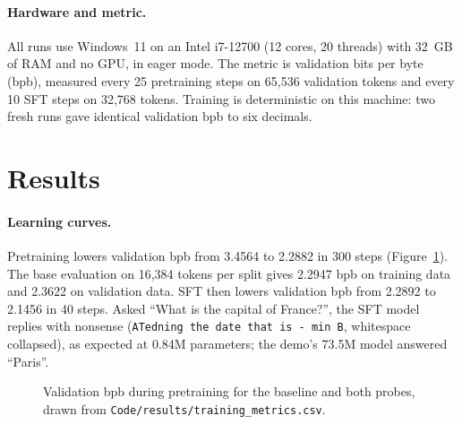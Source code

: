 \documentclass[11pt]{article}
\begin{document}
\paragraph{Hardware and metric.} All runs use Windows~11 on an Intel
i7-12700 (12 cores, 20 threads) with 32~GB of RAM and no GPU, in eager mode.
The metric is validation bits per byte (bpb), measured every 25 pretraining
steps on 65{,}536 validation tokens and every 10 SFT steps on 32{,}768 tokens.
Training is deterministic on this machine: two fresh runs gave identical
validation bpb to six decimals.

\section{Results}

\paragraph{Learning curves.} Pretraining lowers validation bpb from 3.4564 to
2.2882 in 300 steps (Figure~\ref{fig:curves}). The base evaluation on
16{,}384 tokens per split gives 2.2947 bpb on training data and 2.3622 on
validation data. SFT then lowers validation bpb from 2.2892 to 2.1456 in 40
steps. Asked ``What is the capital of France?'', the SFT model replies with
nonsense (\texttt{ATedning the date that is - min B}, whitespace collapsed),
as expected at 0.84M parameters; the demo's 73.5M model answered ``Paris''.

\begin{figure}[t]
\centering
{}
\caption{Validation bpb during pretraining for the baseline and both probes,
drawn from \texttt{Code/results/training\_metrics.csv}.}
\label{fig:curves}
\end{figure}
\end{document}
